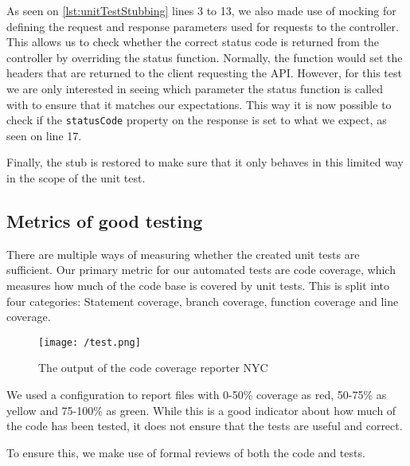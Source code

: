 As seen on \autoref{lst:unitTestStubbing} lines 3 to 13, we also made use of mocking for defining the request and response parameters used for requests to the controller.
This allows us to check whether the correct status code is returned from the controller by overriding the status function.
Normally, the function would set the headers that are returned to the client requesting the API.
However, for this test we are only interested in seeing which parameter the status function is called with to ensure that it matches our expectations.
This way it is now possible to check if the \texttt{statusCode} property on the response is set to what we expect, as seen on line 17.

Finally, the stub is restored to make sure that it only behaves in this limited way in the scope of the unit test.

\subsection{Metrics of good testing}
There are multiple ways of measuring whether the created unit tests are sufficient.
Our primary metric for our automated tests are code coverage, which measures how much of the code base is covered by unit tests.
This is split into four categories: Statement coverage, branch coverage, function coverage and line coverage.

\begin{figure}[H]
    \texttt{[image: /test.png]}
     \caption{The output of the code coverage reporter NYC}
     \label{fig:testResults}
 \end{figure}

We used a configuration to report files with 0-50\% coverage as red, 50-75\% as yellow and 75-100\% as green.
While this is a good indicator about how much of the code has been tested, it does not ensure that the tests are useful and correct.

To ensure this, we make use of formal reviews of both the code and tests.

